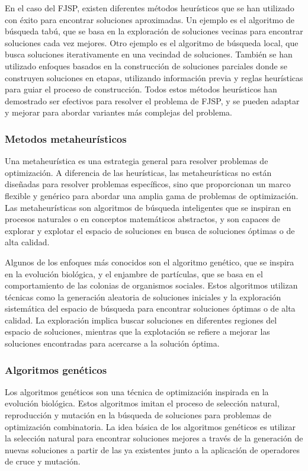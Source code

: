 En el caso del FJSP, existen diferentes métodos heurísticos que se han utilizado con éxito 
para encontrar soluciones aproximadas. Un ejemplo es el algoritmo de búsqueda tabú\cite{Howell_2023}, 
que se basa en la exploración de soluciones vecinas para encontrar soluciones cada vez mejores. 
Otro ejemplo es el algoritmo de búsqueda local, que busca soluciones iterativamente en una 
vecindad de soluciones. También se han utilizado enfoques basados en la construcción de 
soluciones parciales donde se construyen soluciones en etapas, utilizando información previa 
y reglas heurísticas para guiar el proceso de construcción. Todos estos métodos heurísticos 
han demostrado ser efectivos para resolver el problema de FJSP, y se pueden adaptar y mejorar 
para abordar variantes más complejas del problema.

\subsubsection{Metodos metaheurísticos}
Una metaheurística\cite{Metaheuristic_2023} es una estrategia general para resolver problemas 
de optimización. A diferencia de las heurísticas, las metaheurísticas no están diseñadas para resolver 
problemas específicos, sino que proporcionan un marco flexible y genérico para abordar 
una amplia gama de problemas de optimización. Las metaheurísticas son algoritmos de búsqueda 
inteligentes que se inspiran en procesos naturales o en conceptos matemáticos abstractos, 
y son capaces de explorar y explotar el espacio de soluciones en busca de soluciones óptimas 
o de alta calidad.\medskip

Algunos de los enfoques más conocidos son el algoritmo genético, que se inspira en la evolución 
biológica, y el enjambre de partículas, que se basa en el comportamiento de las colonias de 
organismos sociales. Estos algoritmos utilizan técnicas como la generación aleatoria de 
soluciones iniciales y la exploración sistemática del espacio de búsqueda para encontrar 
soluciones óptimas o de alta calidad. La exploración implica buscar soluciones en diferentes 
regiones del espacio de soluciones, mientras que la explotación se refiere a mejorar las 
soluciones encontradas para acercarse a la solución óptima.

\subsubsection{Algoritmos genéticos}
Los algoritmos genéticos\cite{GeneticAlgorithm_2023} son una técnica de optimización inspirada en la evolución biológica.
Estos algoritmos imitan el proceso de selección natural, reproducción y mutación en la búsqueda 
de soluciones para problemas de optimización combinatoria. La idea básica de los algoritmos 
genéticos es utilizar la selección natural para encontrar soluciones mejores a través de la 
generación de nuevas soluciones a partir de las ya existentes junto a la aplicación de operadores 
de cruce y mutación.\medskip

